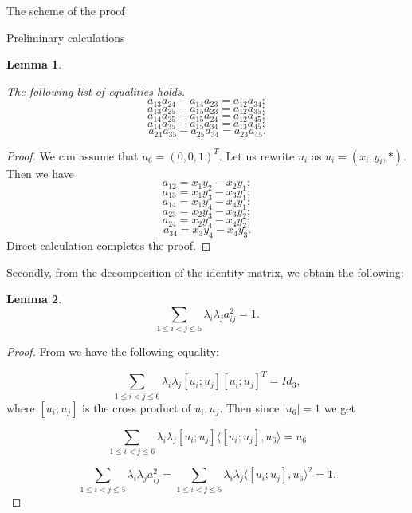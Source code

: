 \documentclass[12pt]{article}
\newtheorem{lemma}{Lemma}[section]
\begin{document}
\begin{section}{The scheme of the proof}
\begin{section}{Preliminary calculations}
    \begin{lemma}
    \label{det-like}
        
    The following list of equalities holds.
        $$
            a_{13}a_{24} - a_{14}a_{23} = a_{12}a_{34};
        $$
        $$
            a_{13}a_{25} - a_{15}a_{23} = a_{12}a_{35};
        $$
        $$
            a_{14}a_{25} - a_{15}a_{24} = a_{12}a_{45};
        $$
        $$
            a_{14}a_{35} - a_{15}a_{34} = a_{13}a_{45};
        $$
        $$
            a_{24}a_{35} - a_{25}a_{34} = a_{23}a_{45}.
        $$
    \end{lemma}

    \begin{proof}
       We can assume that $u_{6} = (0,0,1)^{T}$. Let us rewrite $u_{i}$ as $ u_{i} = (x_{i},y_{i},*).$
        Then we have
        $$
            a_{12} = x_{1}y_{2}-x_{2}y_{1}; 
        $$
        $$
            a_{13} = x_{1}y_{3}-x_{3}y_{1};
        $$
        $$
            a_{14} = x_{1}y_{4}-x_{4}y_{1};
        $$
        $$
            a_{23} = x_{2}y_{3}-x_{3}y_{2};
        $$
         $$
            a_{24} = x_{2}y_{4}-x_{4}y_{2};
        $$
        $$
            a_{34} = x_{3}y_{4}-x_{4}y_{3}.
        $$
        Direct calculation completes the proof.
    \end{proof}

    Secondly, from the decomposition of the identity matrix, we obtain the following:

    \begin{lemma}
    \label{id-cor}
        $$
            \sum_{1\leq i<j\leq 5} \lambda_{i}\lambda_{j}a_{ij}^2= 1.
        $$
    \end{lemma}
    
    \begin{proof}
        From \cite{g-ivanov} we have the following equality:

        $$
            \sum_{1\leq i<j\leq 6}\lambda_{i}\lambda_{j}[u_{i}; u_{j}][u_{i}; u_{j}]^{T} = Id_{3},
        $$
        where $[u_{i}; u_{j}]$ is the cross product of $u_{i},u_{j}$.
        Then since $|u_{6}|=1$ we get

        $$
            \sum_{1\leq i<j\leq 6}\lambda_{i}\lambda_{j}[u_{i}; u_{j}]\langle[u_{i}; u_{j}], u_{6} \rangle = u_{6}
        $$

        $$
         \sum_{1\leq i<j\leq 5} \lambda_{i}\lambda_{j}a_{ij}^2 = \sum_{1\leq i<j\leq 5}\lambda_{i}\lambda_{j}\langle[u_{i}; u_{j}], u_{6} \rangle ^{2}= 1.
        $$
        

\end{proof}
\end{section}
\end{section}
\end{document}
